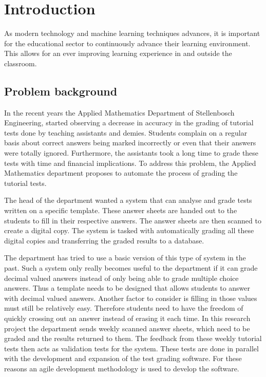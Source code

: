 \chapter{Introduction}
\label{ch:Introduction}
\graphicspath{{Chapter1/Chapter1Figures/}}
As modern technology and machine learning techniques advances, it is important for the educational sector to continuously advance their learning environment. This allows for an ever improving learning experience in and outside the classroom. 

\section{Problem background}

In the recent years the Applied Mathematics Department of Stellenbosch Engineering, started observing a decrease in accuracy in the grading of tutorial tests done by teaching assistants and demies.  Students complain on a regular basis about correct answers being marked incorrectly or even that their answers were totally ignored. Furthermore, the assistants took a long time to grade these tests with time and financial implications. To address this problem, the Applied Mathematics department proposes to automate the process of grading the tutorial tests.

The head of the department wanted a system that can analyse and grade tests written on a specific template. These answer sheets are handed out to the students to fill in their respective answers. The answer sheets are then scanned to create a digital copy. The system is tasked with automatically grading all these digital copies and transferring the graded results to a database.

The department has tried to use a basic version of this type of system in the past. Such a system only really becomes useful to the department if it can grade decimal valued answers instead of only being able to grade multiple choice answers. Thus a template needs to be designed that allows students to answer with decimal valued answers. Another factor to consider is filling in those values must still be relatively easy. Therefore students need to have the freedom of quickly crossing out an answer instead of erasing it each time.
In this research project the department sends weekly scanned answer sheets, which need to be graded and the results returned to them. The feedback from these weekly tutorial tests then acts as validation tests for the system. These tests are done in parallel with the development and expansion of the test grading software. For these reasons an agile development methodology is used to develop the software.

